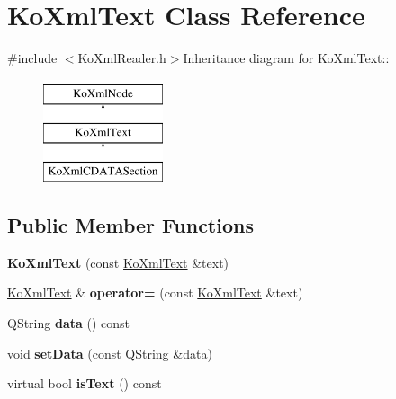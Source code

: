 \hypertarget{classKoXmlText}{
\section{KoXmlText Class Reference}
\label{classKoXmlText}
}


{\ttfamily \#include $<$KoXmlReader.h$>$}Inheritance diagram for KoXmlText::\begin{figure}[H]
\begin{center}
\leavevmode
\includegraphics[height=3cm]{classKoXmlText}
\end{center}
\end{figure}
\subsection*{Public Member Functions}
\begin{DoxyCompactItemize}
\item 
\hypertarget{classKoXmlText_a527977cf8218598fc9744b55d8918dcb}{
{\bfseries KoXmlText} (const \hyperlink{classKoXmlText}{KoXmlText} \&text)}
\label{classKoXmlText_a527977cf8218598fc9744b55d8918dcb}

\item 
\hypertarget{classKoXmlText_abd7ee0d827d614bd5a387cdef944fc68}{
\hyperlink{classKoXmlText}{KoXmlText} \& {\bfseries operator=} (const \hyperlink{classKoXmlText}{KoXmlText} \&text)}
\label{classKoXmlText_abd7ee0d827d614bd5a387cdef944fc68}

\item 
\hypertarget{classKoXmlText_ab5ee4186e97c97fa2bbf54dc9ffc074f}{
QString {\bfseries data} () const }
\label{classKoXmlText_ab5ee4186e97c97fa2bbf54dc9ffc074f}

\item 
\hypertarget{classKoXmlText_a2e3b8ce0b903e43caf233d2b93ebd733}{
void {\bfseries setData} (const QString \&data)}
\label{classKoXmlText_a2e3b8ce0b903e43caf233d2b93ebd733}

\item 
\hypertarget{classKoXmlText_a910aeb556cd3a9bac84baf81899f3490}{
virtual bool {\bfseries isText} () const }
\label{classKoXmlText_a910aeb556cd3a9bac84baf81899f3490}

\end{DoxyCompactItemize}
